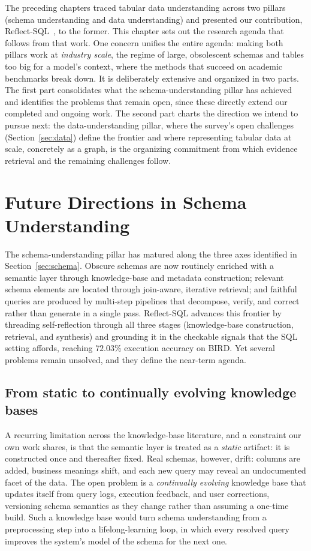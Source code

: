 The preceding chapters traced tabular data understanding across two pillars (schema understanding and data understanding) and presented our contribution, Reflect-SQL~\cite{jain2027reflectsql}, to the former. This chapter sets out the research agenda that follows from that work. One concern unifies the entire agenda: making both pillars work at \emph{industry scale}, the regime of large, obsolescent schemas and tables too big for a model's context, where the methods that succeed on academic benchmarks break down. It is deliberately extensive and organized in two parts. The first part consolidates what the schema-understanding pillar has achieved and identifies the problems that remain open, since these directly extend our completed and ongoing work. The second part charts the direction we intend to pursue next: the data-understanding pillar, where the survey's open challenges (Section~\ref{sec:data}) define the frontier and where representing tabular data at scale, concretely as a graph, is the organizing commitment from which evidence retrieval and the remaining challenges follow.

\section{Future Directions in Schema Understanding}
\label{sec:future-schema}
The schema-understanding pillar has matured along the three axes identified in Section~\ref{sec:schema}. Obscure schemas are now routinely enriched with a semantic layer through knowledge-base and metadata construction; relevant schema elements are located through join-aware, iterative retrieval; and faithful queries are produced by multi-step pipelines that decompose, verify, and correct rather than generate in a single pass. Reflect-SQL advances this frontier by threading self-reflection through all three stages (knowledge-base construction, retrieval, and synthesis) and grounding it in the checkable signals that the SQL setting affords, reaching $72.03\%$ execution accuracy on BIRD. Yet several problems remain unsolved, and they define the near-term agenda.

\subsection{From static to continually evolving knowledge bases}
A recurring limitation across the knowledge-base literature, and a constraint our own work shares, is that the semantic layer is treated as a \emph{static} artifact: it is constructed once and thereafter fixed. Real schemas, however, drift: columns are added, business meanings shift, and each new query may reveal an undocumented facet of the data. The open problem is a \emph{continually evolving} knowledge base that updates itself from query logs, execution feedback, and user corrections, versioning schema semantics as they change rather than assuming a one-time build. Such a knowledge base would turn schema understanding from a preprocessing step into a lifelong-learning loop, in which every resolved query improves the system's model of the schema for the next one.


